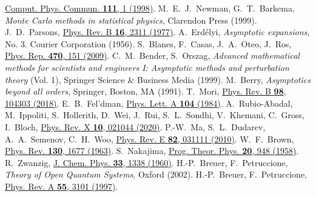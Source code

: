 \documentclass[aps,pre,twocolumn,notitlepage,floats,10pt]{revtex4-1}
\begin{document}
\begin{references}
  \href{https://doi.org/10.1016/S0010-4655(98)00009-5}{Comput. Phys. Commun. {\bf 111}, 1  (1998)}.
  M.~E.~J.~Newman, G.~T.~Barkema, \emph{Monte Carlo methods in statistical physics}, Clarendon Press (1999).
  J.~D.~Parsons,
  \href{https://doi.org/10.1103/PhysRevB.16.2311}{Phys. Rev. B {\bf 16}, 2311 (1977)}.
  A.~Erd\'{e}lyi, \emph{Asymptotic expansions}, No. 3. Courier Corporation (1956).
  S.~Blanes, F.~Casas, J.~A.~Oteo, J.~Ros,
  \href{https://doi.org/10.1016/j.physrep.2008.11.001}{Phys. Rep. {\bf 470}, 151 (2009)}.
  C.~M.~Bender, S.~Orszag, \emph{Advanced mathematical methods for scientists and engineers I: Asymptotic methods and perturbation theory} (Vol. 1), Springer Science \& Business Media (1999).
  M.~Berry, \emph{Asymptotics beyond all orders},  Springer, Boston, MA (1991).
  T.~Mori,
  \href{https://doi.org/10.1103/PhysRevB.98.104303}{Phys. Rev. B {\bf 98}, 104303 (2018)}.
  E.~B.~Fel'dman,
  \href{https://doi.org/10.1016/0375-9601(84)90027-6}{Phys. Lett. A {\bf 104} (1984)}.
  A.~Rubio-Abadal, M.~Ippoliti, S.~Hollerith, D.~Wei, J.~Rui, S.~L.~Sondhi,
  V.~Khemani, C.~Gross, I.~Bloch,
  \href{https://doi.org/10.1103/PhysRevX.10.021044}{Phys. Rev. X {\bf 10}, 021044 (2020)}.
  P.-W.~Ma, S.~L.~Dudarev, A.~A.~Semenov, C.~H.~Woo,
  \href{https://doi.org/10.1103/PhysRevE.82.031111}{Phys. Rev. E {\bf 82}, 031111 (2010)}.
  W.~F.~Brown, \href{https://doi.org/10.1103/PhysRev.130.1677}{Phys. Rev. {\bf 130}, 1677 (1963)}.
  S.~Nakajima,
  \href{https://doi.org/10.1143/PTP.20.948}{Prog. Theor. Phys. {\bf 20}, 948 (1958)}.
  R.~Zwanzig,
  \href{https://doi.org/10.1063/1.1731409}{J. Chem. Phys. {\bf 33}, 1338 (1960)}.
  H.-P.~Breuer, F.~Petruccione, \emph{Theory of Open Quantum Systems}, Oxford (2002).
  H.-P.~Breuer, F.~Petruccione, 
  \href{https://doi.org/10.1103/PhysRevA.55.3101}{Phys. Rev. A {\bf 55}, 3101 (1997)}.
\end{references}
\end{document}
